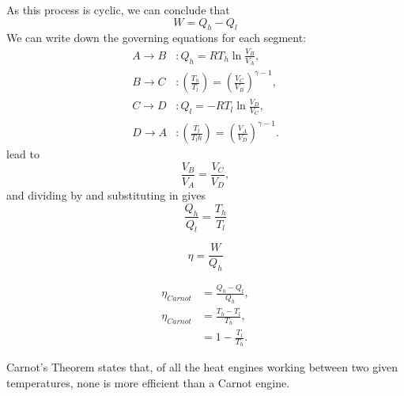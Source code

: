 \begin{thrm}
As this process is cyclic, we can conclude that 
\begin{equation}
W=Q_h-Q_l
\end{equation}
We can write down the governing equations for each segment: 
\begin{subequations}
\begin{align}
A\rightarrow B&:Q_h=RT_h\ln\frac{V_B}{V_A}, \label{car1}\\
B\rightarrow C&:\left(\frac{T_h}{T_l}\right)=\left(\frac{V_C}{V_B}\right)^{\gamma-1}, \label{car2}\\
C\rightarrow D&:Q_l=-RT_l\ln\frac{V_D}{V_C}, \label{car3}\\
D\rightarrow A&:\left(\frac{T_l}{T_lh}\right)=\left(\frac{V_A}{V_D}\right)^{\gamma-1}. \label{car4} 
\end{align}
\end{subequations}
 lead to
\begin{equation}
\label{car5}
\frac{V_B}{V_A}=\frac{V_C}{V_D}, 
\end{equation}
and dividing  by  and substituting in  gives 
\begin{equation}
\label{carnot_relation}
\frac{Q_h}{Q_l}=\frac{T_h}{T_l}
\end{equation}
\end{thrm}

\begin{defi}[Efficiency]
\begin{equation}
\eta=\frac{W}{Q_h}
\end{equation}
\end{defi}

\begin{lemma}
\begin{equation}
\begin{aligned}
\eta_{Carnot}&=\frac{Q_h-Q_l}{Q_h}, \\
\eta_{Carnot}&=\frac{T_h-T_l}{T_h}, \\
&=1-\frac{T_l}{T_h}.  
\end{aligned}
\end{equation}
\end{lemma}

\begin{thrm}
Carnot's Theorem states that, of all the heat engines working between two given temperatures, none is more efficient than a Carnot engine. 
\end{thrm}

